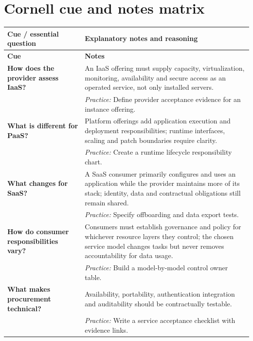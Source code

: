 \documentclass[10pt,letterpaper]{article}
\begin{document}
\section{Cornell cue and notes matrix}
\small\setlength{\LTleft}{0pt}\setlength{\LTright}{0pt plus 1fill}
\begin{longtable}{>{\RaggedRight\arraybackslash}p{}>{\RaggedRight\arraybackslash}p{}}
\toprule\textbf{Cue / essential question}&\textbf{Explanatory notes and reasoning}\\\midrule\endfirsthead\toprule\textbf{Cue}&\textbf{Notes}\\\midrule\endhead
\textbf{How does the provider assess IaaS?} & An IaaS offering must supply capacity, virtualization, monitoring, availability and secure access as an operated service, not only installed servers.\\[3pt]& \textcolor{petrol}{\emph{Practice:} Define provider acceptance evidence for an instance offering.}\\[8pt]\midrule
\textbf{What is different for PaaS?} & Platform offerings add application execution and deployment responsibilities; runtime interfaces, scaling and patch boundaries require clarity.\\[3pt]& \textcolor{petrol}{\emph{Practice:} Create a runtime lifecycle responsibility chart.}\\[8pt]\midrule
\textbf{What changes for SaaS?} & A SaaS consumer primarily configures and uses an application while the provider maintains more of its stack; identity, data and contractual obligations still remain shared.\\[3pt]& \textcolor{petrol}{\emph{Practice:} Specify offboarding and data export tests.}\\[8pt]\midrule
\textbf{How do consumer responsibilities vary?} & Consumers must establish governance and policy for whichever resource layers they control; the chosen service model changes tasks but never removes accountability for data usage.\\[3pt]& \textcolor{petrol}{\emph{Practice:} Build a model-by-model control owner table.}\\[8pt]\midrule
\textbf{What makes procurement technical?} & Availability, portability, authentication integration and auditability should be contractually testable.\\[3pt]& \textcolor{petrol}{\emph{Practice:} Write a service acceptance checklist with evidence links.}\\[8pt]\midrule
\end{longtable}\normalsize
\end{document}
